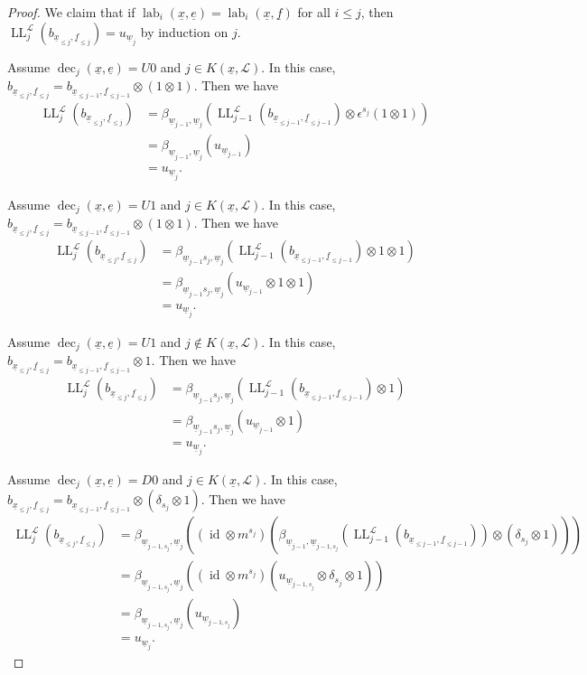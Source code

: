 \documentclass[10pt,a4paper]{amsart}
\DeclareMathOperator{\LL}{LL}
\DeclareMathOperator{\dec}{dec}
\DeclareMathOperator{\id}{id}
\DeclareMathOperator{\lab}{lab}
\newcommand{\scrL}{\mathcal{L}}
\newcommand{\ue}{\underline{e}}
\newcommand{\uf}{\underline{f}}
\newcommand{\uw}{\underline{w}}
\newcommand{\ux}{\underline{x}}
\begin{document}
\begin{proof}
    We claim that if $\lab_i (\ux, \ue) = \lab_i (\ux,\uf)$ for all $i \leq j$, then $\LL_j^{\scrL} (b_{\ux_{\leq j}, \uf_{\leq j}}) = u_{\uw_j}$ by induction on $j$.

    Assume $\dec_j (\ux, \ue) = U0$ and $j \in K(\ux, \scrL)$. In this case, $b_{\ux_{\leq j}, \uf_{\leq j}} = b_{\ux_{\leq j-1}, \uf_{\leq j-1}} \otimes (1 \otimes 1)$.
    Then we have
    \begin{align*}
        \LL_j^{\scrL} (b_{\ux_{\leq j}, \uf_{\leq j}}) &= \beta_{\uw_{j-1}, \uw_j} \left(\LL_{j-1}^{\scrL} (b_{\ux_{\leq j-1}, \uf_{\leq j-1}}) \otimes \epsilon^{s_j} (1 \otimes 1) \right) \\
        &= \beta_{\uw_{j-1}, \uw_j} (u_{\uw_{j-1}}) \\
        &= u_{\uw_j}.
    \end{align*}

    Assume $\dec_j (\ux, \ue) = U1$ and $j \in K(\ux, \scrL)$. In this case, $b_{\ux_{\leq j}, \uf_{\leq j}} = b_{\ux_{\leq j-1}, \uf_{\leq j-1}} \otimes (1 \otimes 1)$.
    Then we have
    \begin{align*}
        \LL_j^{\scrL} (b_{\ux_{\leq j}, \uf_{\leq j}}) &= \beta_{\uw_{j-1}s_j, \uw_j} \left(\LL_{j-1}^{\scrL} (b_{\ux_{\leq j-1}, \uf_{\leq j-1}}) \otimes 1 \otimes 1 \right) \\
        &= \beta_{\uw_{j-1}s_j, \uw_j} (u_{\uw_{j-1}} \otimes 1 \otimes 1) \\
        &= u_{\uw_j}.
    \end{align*}

    Assume $\dec_j (\ux, \ue) = U1$ and $j \notin K(\ux, \scrL)$. In this case, $b_{\ux_{\leq j}, \uf_{\leq j}} = b_{\ux_{\leq j-1}, \uf_{\leq j-1}} \otimes 1$.
    Then we have
    \begin{align*}
        \LL_j^{\scrL} (b_{\ux_{\leq j}, \uf_{\leq j}}) &= \beta_{\uw_{j-1}s_j, \uw_j} \left(\LL_{j-1}^{\scrL} (b_{\ux_{\leq j-1}, \uf_{\leq j-1}}) \otimes 1 \right) \\
        &= \beta_{\uw_{j-1}s_j, \uw_j} (u_{\uw_{j-1}} \otimes 1 ) \\
        &= u_{\uw_j}.
    \end{align*}

    Assume $\dec_j (\ux, \ue) = D0$ and $j \in K(\ux, \scrL)$. In this case, $b_{\ux_{\leq j}, \uf_{\leq j}} = b_{\ux_{\leq j-1}, \uf_{\leq j-1}} \otimes (\delta_{s_j} \otimes 1)$.
    Then we have
    \begin{align*}
        \LL_j^{\scrL} (b_{\ux_{\leq j}, \uf_{\leq j}}) &= \beta_{\uw_{j-1,s_j}, \uw_j} \left( (\id \otimes m^{s_j}) \left( \beta_{\uw_{j-1}, \uw_{j-1,s_j}} \left( \LL_{j-1}^{\scrL} (b_{\ux_{\leq j-1}, \uf_{\leq j-1}}) \right) \otimes (\delta_{s_j} \otimes 1) \right) \right) \\
        &= \beta_{\uw_{j-1,s_j}, \uw_j} \left( (\id \otimes m^{s_j}) \left( u_{\uw_{j-1,s_j}} \otimes \delta_{s_j} \otimes 1 \right) \right) \\
        &= \beta_{\uw_{j-1,s_j}, \uw_j} \left( u_{\uw_{j-1,s_j}}\right) \\
        &= u_{\uw_j}.
    \end{align*}


\end{proof}
\end{document}
